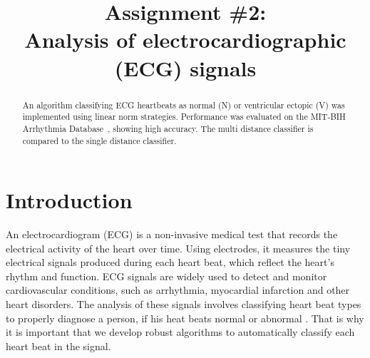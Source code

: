 \documentclass[conference]{IEEEtran}
\begin{document}
\title{Assignment \#2:\\Analysis of electrocardiographic (ECG) signals}

\author{


}

\maketitle

\begin{abstract}
An algorithm classifying ECG heartbeats as normal (N) or ventricular ectopic (V) was implemented using linear norm strategies. Performance was evaluated on the MIT-BIH Arrhythmia Database~\cite{moody2001mitbih}, showing high accuracy. The multi distance classifier is compared to the single distance classifier.
\end{abstract}

\section{Introduction}
An electrocardiogram (ECG) is a non-invasive medical test that records the electrical activity of the heart over time. Using electrodes, it measures the tiny electrical signals produced during each heart beat, which reflect the heart's rhythm and function. ECG signals are widely used to detect and monitor cardiovascular conditions, such as arrhythmia, myocardial infarction and other heart disorders. The analysis of these signals involves classifying heart beat types to properly diagnose a person, if his heat beats normal or abnormal . That is why it is important that we develop robust algorithms to automatically classify each heart beat in the signal.

\end{document}
